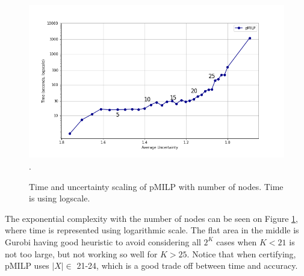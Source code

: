 \begin{figure}[h!]
	\vspace*{-0.8cm}
	\includegraphics[scale=0.6]{Layer3_comparison}.
	\caption{Time and uncertainty scaling of pMILP with number of nodes.
	Time is using logscale.}
	\label{fig3}
\end{figure}



The exponential complexity with the number of nodes can be seen on Figure \ref{fig3}, where time is represented using logarithmic scale. The flat area in the middle is Gurobi having good heuristic to avoid considering all $2^K$ cases when $K<21$ is not too large, but not working so well for $K>25$. Notice that when certifying, pMILP uses $|X| \in$ 21-24, which is a good trade off between time and accuracy.


